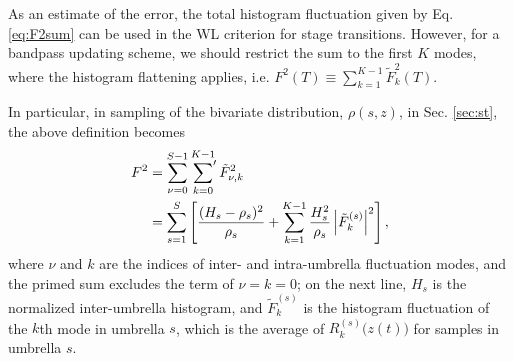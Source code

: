 \documentclass[reprint, superscriptaddress, floatfix]{revtex4-1}
\begin{document}

As an estimate of the error,
the total histogram fluctuation given by Eq. \eqref{eq:F2sum}
can be used in the WL criterion for stage transitions.
%
However, for a bandpass updating scheme,
we should restrict the sum to the first $K$ modes,
where the histogram flattening applies, i.e.
$F^2(T) \equiv \sum_{k = 1}^{K-1} \tilde F_k^2(T)$.
%

In particular,
in sampling of the bivariate distribution,
$\rho(s, z)$, in Sec. \ref{sec:st},
the above definition becomes
\begin{align}
  F^2
  &=
  \sum_{\nu = 0}^{S - 1}
  \sideset{}{'}\sum_{k = 0}^{K - 1}
  \tilde F_{\nu, k}^2
  \notag \\
  &=
  \sum_{s=1}^S
  \left[
  \frac{ (H_s - \rho_s)^2 } { \rho_s }
  +
  \sum_{k = 1}^{K - 1}
  \frac{ H_s^2 } { \rho_s }
  \left|{\tilde F}_k^{(s)} \right|^2
  \right]
  ,
  \label{eq:F2st}
\end{align}
where $\nu$ and $k$ are the indices of
inter- and intra-umbrella fluctuation modes,
and the primed sum excludes
the term of $\nu = k = 0$;
on the next line,
$H_s$ is the normalized inter-umbrella histogram,
and
$\tilde F_k^{(s)}$
is the histogram fluctuation of the $k$th mode in umbrella $s$,
which is the average of $R_k^{(s)}\bigl( z(t) \bigr)$
for samples in umbrella $s$.
\end{document}
